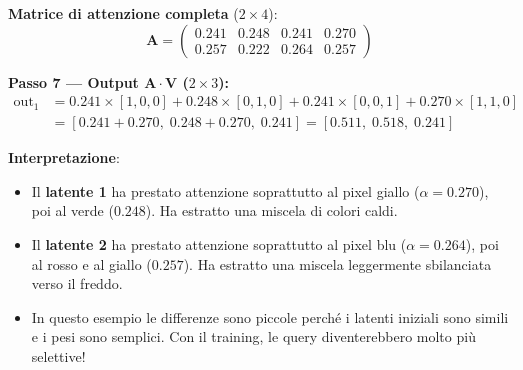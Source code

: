 \documentclass[12pt,a4paper]{article}
\begin{document}
\begin{examplebox}
\textbf{Matrice di attenzione completa} ($2 \times 4$):
\[
\mathbf{A} = \begin{pmatrix} 0.241 & 0.248 & 0.241 & 0.270 \\ 0.257 & 0.222 & 0.264 & 0.257 \end{pmatrix}
\]

\textbf{Passo 7 --- Output $\mathbf{A} \cdot \mathbf{V}$ ($2 \times 3$):}
\begin{align*}
\text{out}_1 &= 0.241 \times [1,0,0] + 0.248 \times [0,1,0] + 0.241 \times [0,0,1] + 0.270 \times [1,1,0] \\
&= [0.241 + 0.270,\; 0.248 + 0.270,\; 0.241] = [0.511,\; 0.518,\; 0.241]
\end{align*}

\textbf{Interpretazione}:
\begin{itemize}
\item Il \textbf{latente 1} ha prestato attenzione soprattutto al pixel giallo ($\alpha = 0.270$), poi al verde ($0.248$). Ha estratto una miscela di colori caldi.
\item Il \textbf{latente 2} ha prestato attenzione soprattutto al pixel blu ($\alpha = 0.264$), poi al rosso e al giallo ($0.257$). Ha estratto una miscela leggermente sbilanciata verso il freddo.
\item In questo esempio le differenze sono piccole perch\'e i latenti iniziali sono simili e i pesi sono semplici. Con il training, le query diventerebbero molto pi\`u selettive!
\end{itemize}
\end{examplebox}
\end{document}
